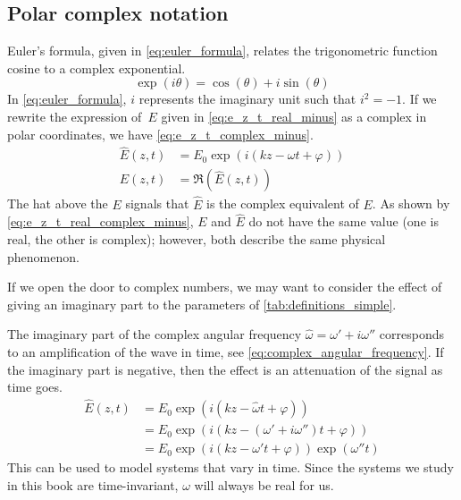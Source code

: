 \subsection{Polar complex notation}
\label{sec:polar_complex_notation}

Euler's formula, given in \cref{eq:euler_formula}, relates the trigonometric function cosine to a complex exponential.
\begin{equation}    
    \exp(i\theta) = \cos(\theta) + i\sin(\theta) \label{eq:euler_formula}
\end{equation}
In \cref{eq:euler_formula}, $i$ represents the imaginary unit such that $i^2=-1$.
If we rewrite the expression of~$E$ given in \cref{eq:e_z_t_real_minus} as a complex in polar coordinates, we have \cref{eq:e_z_t_complex_minus}.
\begin{align}
   \hat{E}(z, t) &= E_0 \exp(i(kz - \omega t + \varphi))
   \label{eq:e_z_t_complex_minus}
   \\
   E(z, t) &= \Re(\hat{E}(z, t))
   \label{eq:e_z_t_real_complex_minus}
\end{align}
The hat above the $E$ signals that $\hat{E}$ is the complex equivalent of $E$.
As shown by \cref{eq:e_z_t_real_complex_minus}, $E$ and $\hat{E}$ do not have the same value (one is real, the other is complex);
however, both describe the same physical phenomenon.

If we open the door to complex numbers, we may want to consider the effect of giving an imaginary part to the parameters of \cref{tab:definitions_simple}.

The imaginary part of the complex angular frequency $\hat{\omega} = \omega' + i \omega''$ corresponds to an amplification of the wave in time, see \cref{eq:complex_angular_frequency}.
If the imaginary part is negative, then the effect is an attenuation of the signal as time goes.
\begin{subequations}
    \begin{align}
       \hat{E}(z, t) &=
       E_0 \exp(i(kz - \hat{\omega} t + \varphi))
       \\
       &=
       E_0 \exp(i(kz - (\omega' + i \omega'') t + \varphi))
       \\
       &=
       E_0 \exp(i(kz - \omega' t + \varphi)) \exp(\omega'' t)
    \end{align}
    \label{eq:complex_angular_frequency}
\end{subequations}
This can be used to model systems that vary in time.
Since the systems we study in this book are time-invariant, $\omega$ will always be real for us.

